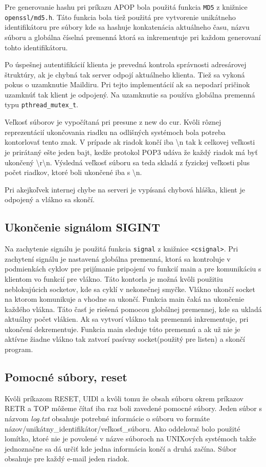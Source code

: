 \documentclass[11pt,a4paper]{article}
\begin{document}
Pre generovanie hashu pri príkazu APOP bola použitá funkcia \texttt{MD5} z knižnice \texttt{openssl/md5.h}. Táto funkcia bola tiež použitá pre vytvorenie unikátneho identifikátoru pre súbory kde sa hashuje konkatenácia aktuálneho času, názvu súboru a globálna číselná premenná ktorá sa inkrementuje pri každom generovaní tohto identifikátoru.

Po úspešnej autentifikácií klienta je prevedná kontrola správnosti adresárovej štruktúry, ak je chybná tak server odpojí aktuálneho klienta. Tiež sa vykoná pokus o uzamknutie Maildiru. Pri tejto implementácií ak sa nepodarí pričinok uzamknúť tak klient je odpojený. Na uzamknutie sa používa globálna premenná typu \texttt{pthread\_mutex\_t}.    

Veľkosť súborov je vypočítaná pri presune z new do cur. Kvôli rôznej reprezentácií ukončovania riadku na odlišných systémoch bola potreba kontorlovať tento znak. V prípade ak riadok končí iba \textbackslash n tak k celkovej veľkosti je prirátaný ešte jeden bajt, kedže protokol POP3 udáva že každý riadok má byť ukončený \textbackslash r\textbackslash n. Výsledná veľkosť súboru sa teda skladá z fyzickej veľkosti plus počet riadkov, ktoré boli ukončené iba s \textbackslash n.


Pri akejkoľvek internej chybe na serveri je vypísaná chybová hláška, klient je odpojený a vlákno sa skončí.
 
\subsection{Ukončenie signálom SIGINT}
Na zachytenie signálu je použitá funkcia \texttt{signal} z knižnice \texttt{<csignal>}. Pri zachytení signálu je nastavená globálna premenná, ktorá sa kontroluje v podmienkách cyklov pre prijímanie pripojení vo funkcií main a pre komunikáciu s klientom vo funkcií pre vlákno. Táto kontorla je možná kvôli použitiu neblokujúcich socketov, kde sa cyklí v nekonečnej smyčke. Vlákno ukončí socket na ktorom komunikuje a vhodne sa ukončí. Funkcia main čaká na ukončenie každého vlákna. Táto časť je riešená pomocou globálnej premennej, kde sa ukladá aktuálny počet vlákien. Ak sa vytvorí vlákno tak premennú inkrementuje, pri ukončení dekrementuje. Funkcia main sleduje túto premennú a ak už nie je aktívne žiadne vlákno tak zatvorí pasívny socket(použitý pre listen) a skončí program.

\subsection{Pomocné súbory, reset}
Kvôli príkazom RESET, UIDl a kvôli tomu že obsah súboru okrem príkazov RETR a TOP môžeme čítať iba raz boli zavedené pomocné súbory. Jeden súbor s názvom \textit{log.txt} obsahuje potrebné informácie o súboru vo formáte názov/unikátny\_identifikátor/veľkosť\_súboru. Ako oddelovač bolo použité lomítko, ktoré nie je povolené v názve súboroch na UNIXových systémoch takže jednoznačne sa dá určiť kde jedna informácia končí a druhá začína. Súbor obsahuje pre každý e-mail jeden riadok. 
\end{document}
